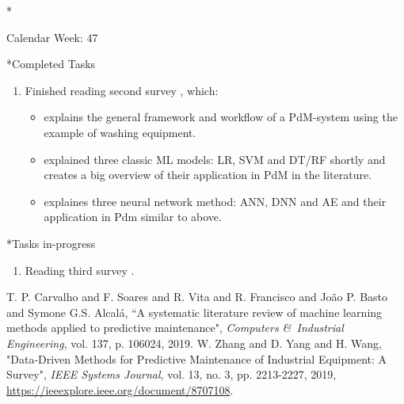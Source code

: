 \documentclass[11pt,a4paper]{article}
\begin{document}
\begin{section}*{Calendar Week: 47 \hfill \date{20 November, 2020}}
	
	\begin{subsection}*{Completed Tasks}
		\begin{enumerate}
			\item Finished reading second survey \cite{survey2}, which:
			\begin{itemize}
				\item explains the general framework and workflow of a PdM-system using the example of washing equipment.
				\item explained three classic ML models: LR, SVM and DT/RF shortly and creates a big overview of their application in PdM in the literature.
				\item explaines three neural network method: ANN, DNN and AE and their application in Pdm similar to above. 
			\end{itemize}
		\end{enumerate}
	\end{subsection}
	
	\begin{subsection}*{Tasks in-progress}
		\begin{enumerate}
			\item
			Reading third survey \cite{survey3}.
		\end{enumerate}
	\end{subsection}
	
	\begin{thebibliography}{9}
		{T. P. Carvalho and F. Soares and R. Vita and R. Francisco and Jo{\~a}o P. Basto and Symone G.S. Alcal{\'a}},
		“A systematic literature review of machine learning methods applied to predictive maintenance",
		\textit{Computers \&\ Industrial Engineering},
		vol. 137,
		p. 106024,
		2019.
		{W. {Zhang} and D. {Yang} and H. {Wang}},
		"Data-Driven Methods for Predictive Maintenance of Industrial Equipment: A Survey",
		\textit{IEEE Systems Journal},
		vol. 13,
		no. 3,
		pp. 2213-2227,
		2019,
		\href{https://ieeexplore.ieee.org/document/8707108}{https://ieeexplore.ieee.org/document/8707108}.
	\end{thebibliography}
\end{section}
\newpage
\end{document}
